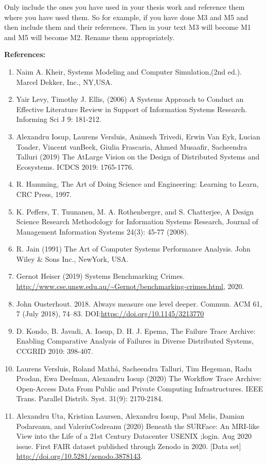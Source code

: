 Only include the ones you have used in your thesis work and reference them where you have used them. So for example, if you have done M3 and M5 and then include them and their references. Then in your text M3 will become M1 and M5 will become M2. Rename them appropriately. 
\newline


\noindent\textbf{References:}
\begin{enumerate}
    \item Naim A. Kheir, Systems Modeling and Computer Simulation,(2nd ed.). Marcel Dekker, Inc., NY,USA.
    \item Yair Levy, Timothy J. Ellis, (2006) A Systems Approach to Conduct an Effective Literature Review in Support of Information Systems Research. Informing Sci J 9: 181-212.
    \item Alexandru Iosup, Laurens Versluis, Animesh Trivedi, Erwin Van Eyk, Lucian Toader, Vincent vanBeek, Giulia Frascaria, Ahmed Musaafir, Sacheendra Talluri (2019) The AtLarge Vision on the Design of Distributed Systems and Ecosystems. ICDCS 2019: 1765-1776.
    \item R. Hamming, The Art of Doing Science and Engineering: Learning to Learn, CRC Press, 1997.
    \item K. Peffers, T. Tuunanen, M. A. Rothenberger, and S. Chatterjee, A Design Science Research Methodology for Information Systems Research, Journal of Management Information Systems 24(3): 45-77 (2008).
    \item R. Jain (1991) The Art of Computer Systems Performance Analysis. John Wiley \& Sons Inc., NewYork, USA.
    \item Gernot Heiser (2019) Systems Benchmarking Crimes. \url{http://www.cse.unsw.edu.au/~Gernot/benchmarking-crimes.html}, 2020. 
    \item John Ousterhout. 2018. Always measure one level deeper. Commun. ACM 61, 7 (July 2018), 74–83. DOI:\url{https://doi.org/10.1145/3213770}
    \item D. Kondo, B. Javadi, A. Iosup, D. H. J. Epema, The Failure Trace Archive: Enabling Comparative Analysis of Failures in Diverse Distributed Systems, CCGRID 2010: 398-407.
    \item Laurens Versluis, Roland Mathá, Sacheendra Talluri, Tim Hegeman, Radu Prodan, Ewa Deelman, Alexandru Iosup (2020) The Workflow Trace Archive: Open-Access Data From Public and Private Computing Infrastructures. IEEE Trans. Parallel Distrib. Syst. 31(9): 2170-2184.
    \item Alexandru Uta, Kristian Laursen, Alexandru Iosup, Paul Melis, Damian Podareanu, and ValeriuCodreanu (2020) Beneath the SURFace: An MRI-like View into the Life of a 21st Century Datacenter USENIX ;login. Aug 2020 issue. First FAIR dataset published through Zenodo in 2020.  [Data set] \url{http://doi.org/10.5281/zenodo.3878143}.

\end{enumerate}
